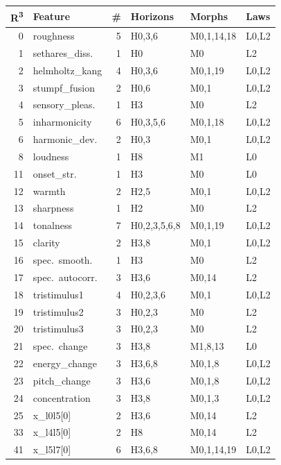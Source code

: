 {\footnotesize
\begin{longtable}{@{}r l r l l l@{}}
\toprule
\textbf{R\textsuperscript{3}} & \textbf{Feature} & \textbf{\#}
  & \textbf{Horizons} & \textbf{Morphs} & \textbf{Laws} \\
\midrule
\endfirsthead
\midrule
\endhead
\endfoot
\bottomrule
\endlastfoot

\rowcolor{grpA}
0 & roughness & 5 & H0,3,6 & M0,1,14,18 & L0,L2 \\
\rowcolor{grpA}
1 & sethares\_diss. & 1 & H0 & M0 & L2 \\
\rowcolor{grpA}
2 & helmholtz\_kang & 4 & H0,3,6 & M0,1,19 & L0,L2 \\
\rowcolor{grpA}
3 & stumpf\_fusion & 2 & H0,6 & M0,1 & L0,L2 \\
\rowcolor{grpA}
4 & sensory\_pleas. & 1 & H3 & M0 & L2 \\
\rowcolor{grpA}
5 & inharmonicity & 6 & H0,3,5,6 & M0,1,18 & L0,L2 \\
\rowcolor{grpA}
6 & harmonic\_dev. & 2 & H0,3 & M0,1 & L0,L2 \\
\rowcolor{grpB}
8 & loudness & 1 & H8 & M1 & L0 \\
\rowcolor{grpB}
11 & onset\_str. & 1 & H3 & M0 & L0 \\
\rowcolor{grpC}
12 & warmth & 2 & H2,5 & M0,1 & L0,L2 \\
\rowcolor{grpC}
13 & sharpness & 1 & H2 & M0 & L2 \\
\rowcolor{grpC}
14 & tonalness & 7 & H0,2,3,5,6,8 & M0,1,19 & L0,L2 \\
\rowcolor{grpC}
15 & clarity & 2 & H3,8 & M0,1 & L0,L2 \\
\rowcolor{grpC}
16 & spec.~smooth. & 1 & H3 & M0 & L2 \\
\rowcolor{grpC}
17 & spec.~autocorr. & 3 & H3,6 & M0,14 & L2 \\
\rowcolor{grpC}
18 & tristimulus1 & 4 & H0,2,3,6 & M0,1 & L0,L2 \\
\rowcolor{grpC}
19 & tristimulus2 & 3 & H0,2,3 & M0 & L2 \\
\rowcolor{grpC}
20 & tristimulus3 & 3 & H0,2,3 & M0 & L2 \\
\rowcolor{grpD}
21 & spec.~change & 3 & H3,8 & M1,8,13 & L0 \\
\rowcolor{grpD}
22 & energy\_change & 3 & H3,6,8 & M0,1,8 & L0,L2 \\
\rowcolor{grpD}
23 & pitch\_change & 3 & H3,6 & M0,1,8 & L0,L2 \\
\rowcolor{grpD}
24 & concentration & 3 & H3,8 & M0,1,3 & L0,L2 \\
\rowcolor{grpE}
25 & x\_l0l5[0] & 2 & H3,6 & M0,14 & L2 \\
\rowcolor{grpE}
33 & x\_l4l5[0] & 2 & H8 & M0,14 & L2 \\
\rowcolor{grpE}
41 & x\_l5l7[0] & 6 & H3,6,8 & M0,1,14,19 & L0,L2 \\
\end{longtable}
}


